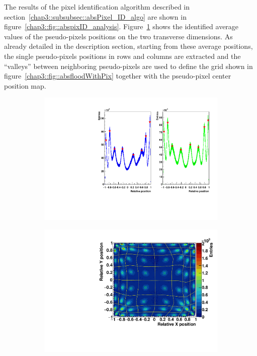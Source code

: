 The results of the pixel identification algorithm described in section~\ref{chap3::subsubsec::absPixel_ID_algo} are shown in figure~\ref{chap3::fig::abspixID_analysis}. Figure~\ref{chap3::fig::abslineColID} shows the identified average values of the pseudo-pixels positions on the two transverse dimensions. As already detailed in the description section, starting from these average positions, the single pseudo-pixels positions in rows and columns are extracted and the \enquote{valleys} between neighboring pseudo-pixels are used to define the grid shown in figure~\ref{chap3::fig::absfloodWithPix} together with the pseudo-pixel center position map.\\
\begin{figure}
\begin{subfigure}[t]{0.5\textwidth}
\centering
\includegraphics[width=1\textwidth]{03_GraphicFiles/chapter3_CLaRySproto/Absorber/images_charResults_Co60/3_Cal_XYProfiles_withPeaks.pdf}
\caption{}
\label{chap3::fig::abslineColID}
\end{subfigure}
\begin{subfigure}[t]{0.5\textwidth}
\centering
\includegraphics[width=1\textwidth]{03_GraphicFiles/chapter3_CLaRySproto/Absorber/images_charResults_Co60/3_Cal_FLOODMAP_pixels_Regions.pdf}

\end{subfigure}
\end{figure}
